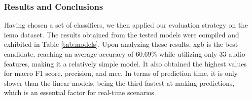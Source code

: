 \subsubsection{Results and Conclusions}

Having chosen a set of classifiers, we then applied our evaluation strategy on the \ac{iemo} dataset. The results obtained from the tested models were compiled and exhibited in Table \ref{tab:models}. Upon analyzing these results, \ac{xgb} is the best candidate, reaching an average accuracy of 60.69\% while utilizing only 33 audio features, making it a relatively simple model. It also obtained the highest values for macro F1 score, precision, and \ac{mcc}. In terms of prediction time, it is only slower than the linear models, being the third fastest at making predictions, which is an essential factor for real-time scenarios.

\begin{table}[H]
	\centering
	\caption{Tested models' 5-fold stratified \ac{cv} performance on \ac{iemo}.}
	\label{tab:models}
\end{table}

